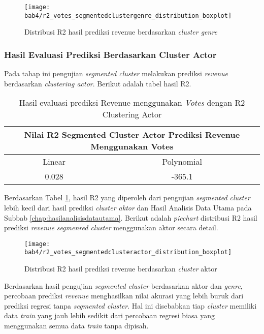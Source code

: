 \begin{figure}[H]
	\centering  
	\texttt{[image: bab4/r2\_votes\_segmentedclustergenre\_distribution\_boxplot]}   
	\caption{Distribusi R2 hasil prediksi revenue berdasarkan \textit{cluster genre}  }	\label{fig:r2_votes_segmentedclustergenre_distribution_boxplot} 
\end{figure}


\subsubsection{Hasil Evaluasi Prediksi Berdasarkan Cluster Actor}

Pada tahap ini pengujian \textit{segmented cluster} melakukan prediksi \textit{revenue} berdasarkan \textit{clustering actor}. Berikut adalah tabel hasil R2.

\begin{table}[H]
\centering
\caption{Hasil evaluasi prediksi Revenue menggunakan \textit{Votes} dengan R2 Clustering Actor }
\begin{tabular}{|c|c|}
 \hline 
 \multicolumn{2}{|c|}{Nilai R2 Segmented Cluster Actor Prediksi Revenue Menggunakan Votes} \\ 
 \hline 
 Linear & Polynomial \\ 
 \hline 
 0.028 & -365.1 \\ 
 \hline 
 \end{tabular}  
\label{tab:r2_segmentedcluster_actor}
\end{table}

Berdasarkan Tabel \ref{tab:r2_segmentedcluster_actor}, hasil R2 yang diperoleh dari pengujian \textit{segmented cluster} lebih kecil dari hasil prediksi \textit{cluster aktor} dan Hasil Analisis Data Utama pada Subbab \ref{chap:hasilanalisisdatautama}. Berikut adalah \textit{piechart} distribusi R2 hasil prediksi \textit{revenue} \textit{segmenred cluster} menggunakan aktor secara detail. 

\begin{figure}[H]
	\centering  
	\texttt{[image: bab4/r2\_votes\_segmentedclusteractor\_distribution\_boxplot]}   
	\caption{Distribusi R2 hasil prediksi revenue berdasarkan \textit{cluster} aktor }	\label{fig:r2_votes_segmentedclustergenre_distribution_boxplot} 
\end{figure}


Berdasarkan hasil pengujian \textit{segmented cluster} berdasarkan aktor dan \textit{genre}, percobaan prediksi \textit{revenue} menghasilkan nilai akurasi yang lebih buruk dari prediksi regresi tanpa \textit{segmented cluster}. Hal ini disebabkan tiap \textit{cluster} memiliki data \textit{train} yang jauh lebih sedikit dari percobaan regresi biasa yang menggunakan semua data \textit{train} tanpa dipisah. 